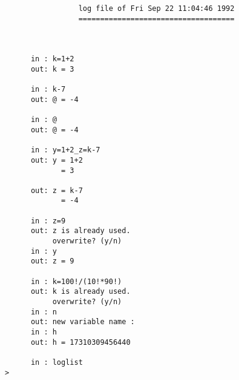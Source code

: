 \begin{verbatim}
                       log file of Fri Sep 22 11:04:46 1992
                       ====================================



            in : k=1+2
            out: k = 3

            in : k-7
            out: @ = -4

            in : @
            out: @ = -4

            in : y=1+2_z=k-7
            out: y = 1+2
                   = 3

            out: z = k-7
                   = -4

            in : z=9
            out: z is already used.
                 overwrite? (y/n)
            in : y
            out: z = 9

            in : k=100!/(10!*90!)
            out: k is already used.
                 overwrite? (y/n)
            in : n
            out: new variable name :
            in : h
            out: h = 17310309456440

            in : loglist
      >
\end{verbatim}


